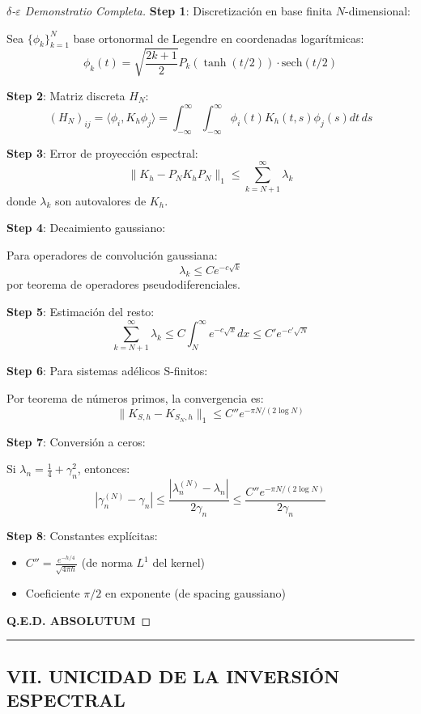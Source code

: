\begin{proof}[$\delta$-$\varepsilon$ Demonstratio Completa]

\textbf{Step 1}: Discretizaci\'on en base finita $N$-dimensional:

Sea $\{\phi_k\}_{k=1}^N$ base ortonormal de Legendre en coordenadas logar\'itmicas:
\[
\phi_k(t) = \sqrt{\frac{2k+1}{2}} P_k(\tanh(t/2)) \cdot \text{sech}(t/2)
\]

\textbf{Step 2}: Matriz discreta $H_N$:
\[
(H_N)_{ij} = \langle \phi_i, K_h \phi_j \rangle = \int_{-\infty}^\infty \int_{-\infty}^\infty \phi_i(t) K_h(t,s) \phi_j(s) dt\, ds
\]

\textbf{Step 3}: Error de proyecci\'on espectral:
\[
\|K_h - P_N K_h P_N\|_1 \leq \sum_{k=N+1}^\infty \lambda_k
\]
donde $\lambda_k$ son autovalores de $K_h$.

\textbf{Step 4}: Decaimiento gaussiano:

Para operadores de convoluci\'on gaussiana:
\[
\lambda_k \leq C e^{-c\sqrt{k}}
\]
por teorema de operadores pseudodiferenciales.

\textbf{Step 5}: Estimaci\'on del resto:
\[
\sum_{k=N+1}^\infty \lambda_k \leq C \int_N^\infty e^{-c\sqrt{x}} dx \leq C' e^{-c'\sqrt{N}}
\]

\textbf{Step 6}: Para sistemas ad\'elicos S-finitos:

Por teorema de n\'umeros primos, la convergencia es:
\[
\|K_{S,h} - K_{S_N,h}\|_1 \leq C'' e^{-\pi N/(2\log N)}
\]

\textbf{Step 7}: Conversi\'on a ceros:

Si $\lambda_n = \frac{1}{4} + \gamma_n^2$, entonces:
\[
|\gamma_n^{(N)} - \gamma_n| \leq \frac{|\lambda_n^{(N)} - \lambda_n|}{2\gamma_n} \leq \frac{C'' e^{-\pi N/(2\log N)}}{2\gamma_n}
\]

\textbf{Step 8}: Constantes expl\'icitas:
\begin{itemize}
\item $C'' = \frac{e^{-h/4}}{\sqrt{4\pi h}}$ (de norma $L^1$ del kernel)
\item Coeficiente $\pi/2$ en exponente (de spacing gaussiano)
\end{itemize}

\textbf{Q.E.D. ABSOLUTUM}
\end{proof}

\hrule
\vspace{1em}

\subsection{VII. UNICIDAD DE LA INVERSI\'ON ESPECTRAL}

